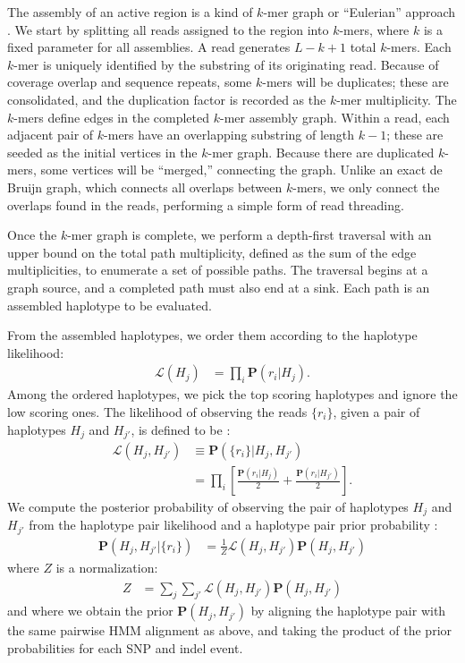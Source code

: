 \documentclass{acm_proc_article-sp}
\begin{document}
The assembly of an active region is a kind of $k$-mer graph or ``Eulerian''
approach \cite{pevzner01}.
We start by splitting all reads assigned to the region into $k$-mers, where $k$
is a fixed parameter for all assemblies.
A read generates $L-k+1$ total $k$-mers.
Each $k$-mer is uniquely identified by the substring of its originating read.
Because of coverage overlap and sequence repeats, some $k$-mers will be
duplicates;
these are consolidated, and the duplication factor is recorded as the
$k$-mer multiplicity.
The $k$-mers define edges in the completed $k$-mer assembly graph.
Within a read, each adjacent pair of $k$-mers have an overlapping substring of
length $k-1$;
these are seeded as the initial vertices in the $k$-mer graph.
Because there are duplicated $k$-mers, some vertices will be ``merged,''
connecting the graph.
Unlike an exact de Bruijn graph, which connects all overlaps between $k$-mers,
we only connect the overlaps found in the reads, performing a simple form of
read threading.

Once the $k$-mer graph is complete, we perform a depth-first traversal with an
upper bound on the total path multiplicity, defined as the sum of the edge
multiplicities, to enumerate a set of possible paths.
The traversal begins at a graph source, and a completed path must also end at a
sink.
Each path is an assembled haplotype to be evaluated.

From the assembled haplotypes, we order them according to the haplotype
likelihood:
\begin{align}
  \mathcal L(H_j)
  &=\prod_i\mathbf P(r_i|H_j).
\end{align}
Among the ordered haplotypes, we pick the top scoring haplotypes and ignore
the low scoring ones.
The likelihood of observing the reads $\{r_i\}$, given a pair of haplotypes
$H_j$ and $H_{j'}$, is defined to be \cite{albers11}:
\begin{align}
  \mathcal L(H_j,H_{j'})
  &\equiv\mathbf P(\{r_i\}|H_j,H_{j'}) \\ \nonumber
  &=\prod_i\left[ \frac{\mathbf P(r_i|H_j) }{2} + \frac{\mathbf P(r_i|H_{j'})}{2} \right].
\end{align}
We compute the posterior probability of observing the pair of haplotypes
$H_j$ and $H_{j'}$ from the haplotype pair likelihood and a haplotype pair
prior probability \cite{albers11}:
\begin{align}
  \mathbf P (H_j,H_{j'}|\{r_i\})&=\frac{1}{Z}\mathcal L(H_j,H_{j'})\mathbf P(H_j,H_{j'})
\end{align}
where $Z$ is a normalization:
\begin{align*}
  Z&=\sum_j\sum_{j'}\mathcal L(H_j,H_{j'})\mathbf P(H_j,H_{j'})
\end{align*}
and where we obtain the prior $\mathbf P (H_j,H_{j'})$ by aligning the haplotype
pair with the same pairwise HMM alignment as above, and taking the product of
the prior probabilities for each SNP and indel event.
\end{document}
